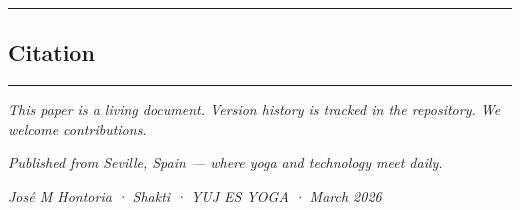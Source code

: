 \documentclass[11pt,a4paper]{article}
\begin{document}
\begin{center}\rule{0.5\linewidth}{0.5pt}\end{center}

\hypertarget{citation}{%
\subsection{Citation}\label{citation}}

\begin{Shaded}
\begin{Highlighting}[]
\NormalTok{\{}\NormalTok{,}
\NormalTok{\}}
\end{Highlighting}
\end{Shaded}

\begin{center}\rule{0.5\linewidth}{0.5pt}\end{center}

\emph{This paper is a living document. Version history is tracked in the
repository. We welcome contributions.}

\emph{Published from Seville, Spain --- where yoga and technology meet
daily.}

\emph{José M Hontoria · Shakti · YUJ ES YOGA · March 2026}
\end{document}

